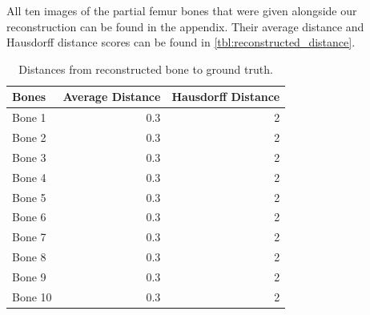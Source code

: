 All ten images of the partial femur bones that were given alongside our reconstruction can be found in the appendix. 
Their average distance and Hausdorff distance scores can be found in \autoref{tbl:reconstructed_distance}.

\begin{table}
\centering
\caption{Distances from reconstructed bone to ground truth.}
\label{tbl:reconstructed_distance}
\begin{tabular}{lrr}
\toprule
\textbf{Bones} &
Average Distance &
Hausdorff Distance \\
\midrule
Bone 1& 0.3 & 2 \\
Bone 2& 0.3 & 2 \\
Bone 3& 0.3 & 2 \\
Bone 4& 0.3 & 2 \\
Bone 5& 0.3 & 2 \\
Bone 6& 0.3 & 2 \\
Bone 7& 0.3 & 2 \\
Bone 8& 0.3 & 2 \\
Bone 9& 0.3 & 2 \\
Bone 10& 0.3 & 2 \\
\bottomrule
\end{tabular}
\end{table}